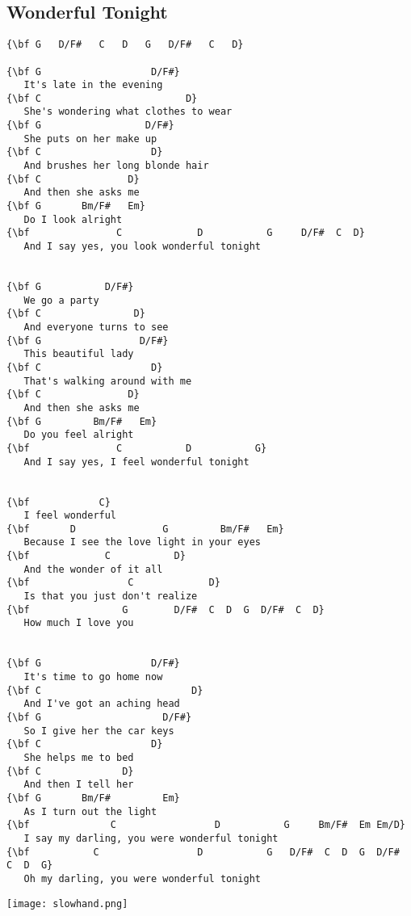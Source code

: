 \documentclass[a4paper]{article}
\begin{document}
\subsection{Wonderful Tonight} %
\label{sub:Wonderful Tonig}
\begin{Verbatim}[commandchars=\\\{\}]
{\bf G   D/F#   C   D   G   D/F#   C   D}

{\bf G                   D/F#}
   It's late in the evening
{\bf C                         D}
   She's wondering what clothes to wear
{\bf G                  D/F#}
   She puts on her make up
{\bf C                   D}
   And brushes her long blonde hair
{\bf C               D}
   And then she asks me
{\bf G       Bm/F#   Em}
   Do I look alright
{\bf               C             D           G     D/F#  C  D}
   And I say yes, you look wonderful tonight


{\bf G           D/F#}
   We go a party
{\bf C                D}
   And everyone turns to see
{\bf G                 D/F#}
   This beautiful lady
{\bf C                   D}
   That's walking around with me
{\bf C               D}
   And then she asks me
{\bf G         Bm/F#   Em}
   Do you feel alright
{\bf               C           D           G}
   And I say yes, I feel wonderful tonight


{\bf            C}
   I feel wonderful
{\bf       D               G         Bm/F#   Em}
   Because I see the love light in your eyes
{\bf             C           D}
   And the wonder of it all
{\bf                 C             D}
   Is that you just don't realize
{\bf                G        D/F#  C  D  G  D/F#  C  D}
   How much I love you


{\bf G                   D/F#}
   It's time to go home now
{\bf C                          D}
   And I've got an aching head
{\bf G                     D/F#}
   So I give her the car keys
{\bf C                   D}
   She helps me to bed
{\bf C              D}
   And then I tell her
{\bf G       Bm/F#         Em}
   As I turn out the light
{\bf              C                 D           G     Bm/F#  Em Em/D}
   I say my darling, you were wonderful tonight
{\bf           C                 D           G   D/F#  C  D  G  D/F#  C  D  G}
   Oh my darling, you were wonderful tonight
\end{Verbatim}
\vspace{5cm}
\centerline{\texttt{[image: slowhand.png]}}

\newpage
\end{document}
